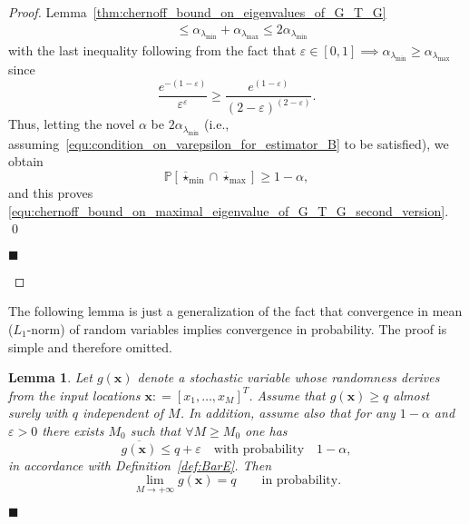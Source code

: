 \documentclass[10pt,twocolumn,twoside]{IEEEtran}					%
\newcounter{generalCounter}
\theoremstyle	{plain}
\newtheorem		{lemma}			[generalCounter]	{Lemma}
\newcommand{\DefinedAs}			[0]	{\mathrel{\mathop:}=}
\newcommand{\Probability}			[0]	{\mathbb{P}}
\newcommand{\ProbabilityOf}			[1]	{\Probability \left[ #1 \right]}
\newcommand	{\Definition}			[0]	{Definition}
\begin{document}
\begin{proof}{Lemma~\ref{thm:chernoff_bound_on_eigenvalues_of_G_T_G}}
\begin{equation}
\begin{array}{ll}
		& \leq
		\alpha_{\lambda_{\min}} + \alpha_{\lambda_{\max}}
		\leq
		2 \alpha_{\lambda_{\min}}
		\end{array}
	\end{equation}
	with the last inequality following from the fact that $\varepsilon \in \left[ 0, 1 \right] \implies \alpha_{\lambda_{\min}} \geq \alpha_{\lambda_{\max}}$ since
	\begin{equation}
		\frac{e^{-(1-\varepsilon)}}{\varepsilon^{\varepsilon}}
		\geq
		\frac{e^{(1-\varepsilon)}}{(2-\varepsilon)^{(2-\varepsilon)}} .
	\end{equation}
	Thus, letting the novel $\alpha$ be $2 \alpha_{\lambda_{\min}}$ (i.e., assuming~\eqref{equ:condition_on_varepsilon_for_estimator_B} to be satisfied), we obtain
	\begin{equation}
		\ProbabilityOf{\overline{\star}_{\min} \cap \overline{\star}_{\max}}
		\geq
		1 - \alpha ,
	\end{equation}
	and this proves \eqref{equ:chernoff_bound_on_maximal_eigenvalue_of_G_T_G_second_version}. \qed
	\begin{flushright}
$\blacksquare$
\end{flushright}
\end{proof}


The following lemma is just a generalization of the fact that convergence in mean ($L_1$-norm) of random variables implies 
convergence in probability. The proof is simple and therefore omitted.

\begin{lemma}
Let $g(\bm{x})$ denote a stochastic variable whose randomness derives from the input locations $\bm{x} \DefinedAs \left[ x_{1}, \ldots, x_{M} \right]^{T}$. Assume that $g(\bm{x}) \geq q$ almost surely with $q$ independent of $M$. In addition, assume also that for any $1-\alpha$ and $\varepsilon>0$ there exists $M_0$ such that $\forall M \geq M_0$ one has 
$$
\overline{g(\bm{x})} \leq q + \varepsilon \quad \text{with probability} \quad 1 - \alpha,
$$ 
in accordance with \Definition~\ref{def:BarE}. Then
	\begin{equation}
		\displaystyle
		\lim_{M \rightarrow + \infty}
		g(\bm{x})
		=
		q
		\qquad
		\text{in probability.}
	\end{equation}
	\label{Lemmaq}
		\begin{flushright}
$\blacksquare$
\end{flushright}
\end{lemma}
\end{document}
